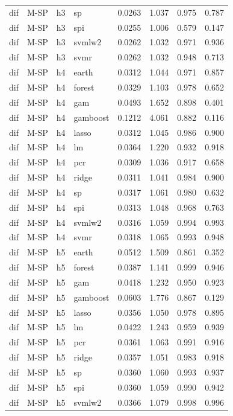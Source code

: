 \begin{ThreePartTable}
\begin{longtable}[t]{llclcccc}
dif & M-SP & h3 & sp & 0.0263 & 1.037 & 0.975 & 0.787\\
dif & M-SP & h3 & spi & 0.0255 & 1.006 & 0.579 & 0.147\\
dif & M-SP & h3 & svmlw2 & 0.0262 & 1.032 & 0.971 & 0.936\\
dif & M-SP & h3 & svmr & 0.0262 & 1.032 & 0.948 & 0.713\\
\addlinespace
dif & M-SP & h4 & earth & 0.0312 & 1.044 & 0.971 & 0.857\\
dif & M-SP & h4 & forest & 0.0329 & 1.103 & 0.978 & 0.652\\
dif & M-SP & h4 & gam & 0.0493 & 1.652 & 0.898 & 0.401\\
dif & M-SP & h4 & gamboost & 0.1212 & 4.061 & 0.882 & 0.116\\
dif & M-SP & h4 & lasso & 0.0312 & 1.045 & 0.986 & 0.900\\
dif & M-SP & h4 & lm & 0.0364 & 1.220 & 0.932 & 0.918\\
dif & M-SP & h4 & pcr & 0.0309 & 1.036 & 0.917 & 0.658\\
dif & M-SP & h4 & ridge & 0.0311 & 1.041 & 0.984 & 0.900\\
dif & M-SP & h4 & sp & 0.0317 & 1.061 & 0.980 & 0.632\\
dif & M-SP & h4 & spi & 0.0313 & 1.048 & 0.968 & 0.763\\
dif & M-SP & h4 & svmlw2 & 0.0316 & 1.059 & 0.994 & 0.993\\
dif & M-SP & h4 & svmr & 0.0318 & 1.065 & 0.993 & 0.948\\
\addlinespace
dif & M-SP & h5 & earth & 0.0512 & 1.509 & 0.861 & 0.352\\
dif & M-SP & h5 & forest & 0.0387 & 1.141 & 0.999 & 0.946\\
dif & M-SP & h5 & gam & 0.0418 & 1.232 & 0.950 & 0.923\\
dif & M-SP & h5 & gamboost & 0.0603 & 1.776 & 0.867 & 0.129\\
dif & M-SP & h5 & lasso & 0.0356 & 1.050 & 0.978 & 0.895\\
dif & M-SP & h5 & lm & 0.0422 & 1.243 & 0.959 & 0.939\\
dif & M-SP & h5 & pcr & 0.0361 & 1.063 & 0.991 & 0.916\\
dif & M-SP & h5 & ridge & 0.0357 & 1.051 & 0.983 & 0.918\\
dif & M-SP & h5 & sp & 0.0360 & 1.060 & 0.993 & 0.937\\
dif & M-SP & h5 & spi & 0.0360 & 1.059 & 0.990 & 0.942\\
dif & M-SP & h5 & svmlw2 & 0.0366 & 1.079 & 0.998 & 0.996\\

\end{longtable}
\end{ThreePartTable}
